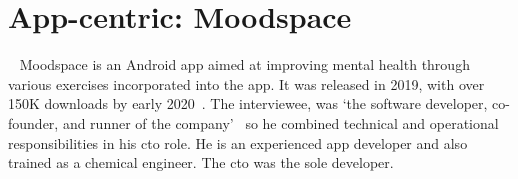 


\section{App-centric: Moodspace}~\label{case-study-overview-moodspace} %
Moodspace is an Android app aimed at improving mental health through various exercises incorporated into the app. %
It was released in 2019, with over 150K downloads by early 2020~. The interviewee, was `the software developer, co-founder, and runner of the company'~ so he combined technical and operational responsibilities in his \Gls{cto} role. He is an experienced app developer and also trained as a chemical engineer. The \Gls{cto} was the sole developer. 

